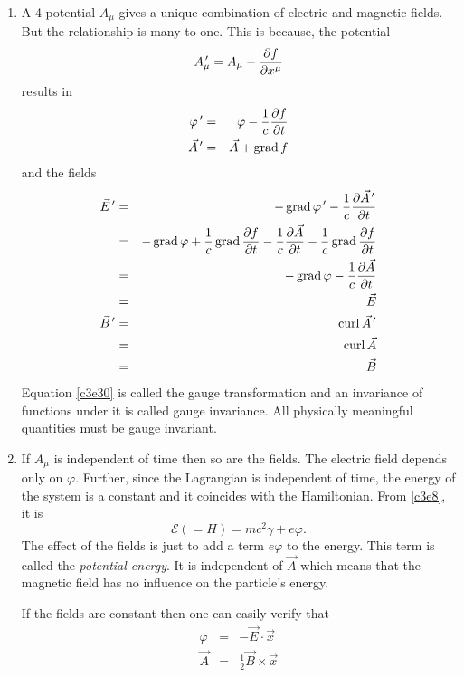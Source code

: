 \begin{enumerate}
\item A 4-potential $A_\mu$ gives a unique combination of electric and magnetic
fields. But the relationship is many-to-one. This is because, the potential
\begin{equation}\label{c3e30}
A_\mu^{\,\prime} = A_\mu - \frac{\partial{f}}{\partial{x^\mu}}
\end{equation}
results in
\begin{eqnarray}
\varphi^{\,\prime} &=& \varphi - \frac{1}{c}\frac{\partial{f}}{\partial{t}} \label{c3e31} \\
\vec{A}^{\,\prime} &=& \vec{A} + \operatorname{grad} f \label{c3e32}
\end{eqnarray}
and the fields
\begin{eqnarray}
\vec{E}^{\,\prime} &=& -\operatorname{grad}{\varphi^{\,\prime}} - \frac{1}{c}\frac{\partial{\vec{A}^{\,\prime}}}{\partial{t}} \nonumber \\
 &=& -\operatorname{grad}\varphi + \frac{1}{c}\operatorname{grad}\frac{\partial{f}}{\partial{t}} - 
      \frac{1}{c}\frac{\partial{\vec{A}}}{\partial{t}} - \frac{1}{c}\operatorname{grad}{\frac{\partial{f}}{\partial{t}}} \nonumber \\
 &=& -\operatorname{grad}\varphi - \frac{1}{c}\frac{\partial{\vec{A}}}{\partial{t}} \nonumber \\
 &=& \vec{E} \label{c3e33} \\
\vec{B}^{\,\prime} &=& \operatorname{curl}\vec{A}^{\,\prime} \nonumber \\
 &=& \operatorname{curl}\vec{A} \nonumber \\
 &=& \vec{B} \label{c3e34}
\end{eqnarray}
Equation \eqref{c3e30} is called the gauge transformation and an invariance of
functions under it is called gauge invariance. All physically meaningful quantities
must be gauge invariant.

\item If $A_\mu$ is independent of time then so are the fields. The electric field
depends only on $\varphi$. Further, since the Lagrangian is independent of time, the
energy of the system is a constant and it coincides with the Hamiltonian. From
\eqref{c3e8}, it is
\begin{equation}\label{c3e35}
\mathcal{E} (= H) = mc^2\gamma + e\varphi.
\end{equation} 
The effect of the fields is just to add a term $e\varphi$ to the energy. This term
is called the \emph{potential energy}. It is independent of $\vec{A}$ which means
that the magnetic field has no influence on the particle's energy.

If the fields are constant then one can easily verify that
\begin{eqnarray}
\varphi &=& -\vec{E}\cdot\vec{x} \label{c3e36} \\
\vec{A} &=& \frac{1}{2}\vec{B} \times \vec{x} \label{c3e37}
\end{eqnarray}


\end{enumerate}
